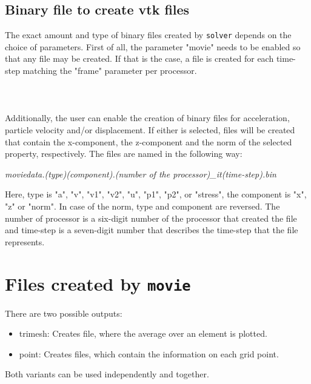		\subsection{Binary file to create vtk files}
		\label{subsec:binvtk}
			The exact amount and type of binary files created by \texttt{solver} depends on the choice of parameters. First of all, the parameter "movie" needs to be enabled so that any file may be created. If that is the case, a file is created for each time-step matching the "frame" parameter per processor. \\
			\\
			 \\
			\\
			Additionally, the user can enable the creation of binary files for acceleration, particle velocity and/or displacement. If either is selected, files will be created that contain the x-component, the z-component and the norm of the selected property, respectively. The files are named in the following way:
			\begin{center}%
				\emph{moviedata.(type)(component).(number of the processor)\_it(time-step).bin}
			\end{center} 
			Here, type is "a", "v", "v1", "v2", "u", "p1", "p2", or "stress", the component is "x", "z" or "norm". In case of the norm, type and component are reversed. The number of processor is a six-digit number of the processor that created the file and time-step is a seven-digit number that describes the time-step that the file represents. \\

			
	\section{Files created by \texttt{movie}}
	\label{sec:movieout}
		There are two possible outputs: 
		\begin{itemize}
			\item trimesh: Creates file, where the average  over an element is plotted.
			\item point: Creates files, which contain the information on each grid point.
		\end{itemize}
		Both variants can be used independently and together.
					

